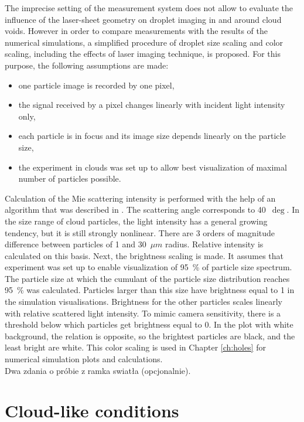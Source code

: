 \documentclass[../main.tex]{subfiles}
\begin{document}
The imprecise setting of the measurement system does not allow to evaluate the influence of the laser-sheet geometry on droplet imaging in and around cloud voids. However in order to compare measurements with the results of the numerical simulations, a simplified procedure of droplet size scaling and color scaling, including the effects of laser imaging technique, is proposed. For this purpose, the following assumptions are made:
\begin{itemize}
\item one particle image is recorded by one pixel,
\item the signal received by a pixel changes linearly with incident light intensity only,
\item each particle is in focus and its image size depends linearly on the particle size,
\item the experiment in clouds was set up to allow best visualization of maximal number of particles possible.
\end{itemize}
Calculation of the Mie scattering intensity is performed with the help of an algorithm that was described in \citet{Bohren2007}. The scattering angle corresponds to 40~$\deg$. In the size range of cloud particles, the light intensity has a general growing tendency, but it is still strongly nonlinear. There are 3 orders of magnitude difference between particles of 1 and 30~$\mu m$ radius. Relative intensity is calculated on this basis. Next, the brightness scaling is made. It assumes that experiment was set up to enable visualization of 95~\% of particle size spectrum. The particle size at which the cumulant of the particle size distribution reaches 95~\% was calculated. Particles larger than this size have brightness equal to 1 in the simulation visualisations. Brightness for the other particles scales linearly with relative scattered light intensity. To mimic camera sensitivity, there is a threshold below which particles get brightness equal to 0. In the plot with white background, the relation is opposite, so the brightest particles are black, and the least bright are white. This color scaling is used in Chapter \autoref{ch:holes} for numerical simulation plots and calculations.\\
Dwa zdania o próbie z ramka swiatła (opcjonalnie).

\section{Cloud-like conditions}
\label{ch2s5}
\end{document}
